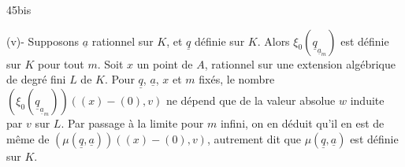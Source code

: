 45bis

(v)- Supposons $\underline{a}$ rationnel sur $K$, et $\underline{q}$ définie sur $K$. Alors $\xi_0(\underline{q}_{\underline{a}_m})$ est définie sur $K$ pour tout $m$. Soit $x$ un point de $A$, rationnel sur une extension algébrique de degré fini $L$ de $K$. Pour $\underline{q}$, $\underline{a}$, $x$ et $m$ fixés, le nombre $(\xi_0(\underline{q}_{\underline{a}_m}))((x)-(0),v)$ ne dépend que de la valeur absolue $w$ induite par $v$ sur $L$. Par passage à  la limite pour $m$ infini, on en déduit qu'il en est de même de $(\mu(\underline{q},\underline{a}))((x)-(0),v)$, autrement dit que $\mu(\underline{q},\underline{a})$ est définie sur $K$.
